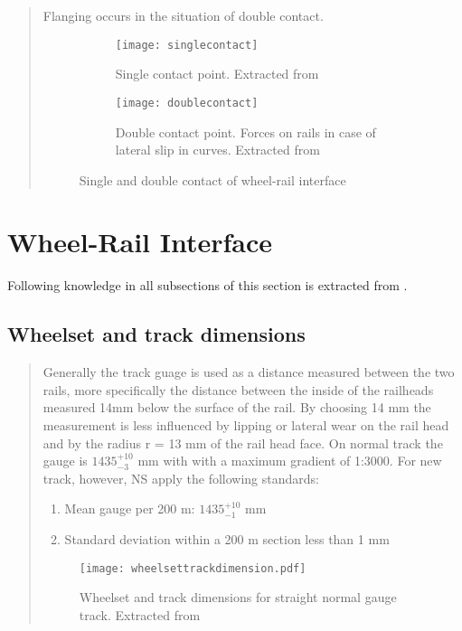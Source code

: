 \begin{quote}
Flanging occurs in the situation of double contact. 

\begin{figure}[h!]
\centering
    \begin{subfigure}[b]{0.2\textwidth}
        \centering
        \texttt{[image: singlecontact]}
        \caption{Single contact point.  Extracted from \citet[Figure 2.13]{esveld2001modern}}
        \label{fig:singlecontact}
    \end{subfigure}
    \begin{subfigure}[b]{0.5\textwidth}
        \texttt{[image: doublecontact]}
        \caption{Double contact point. Forces on rails in case of lateral slip in curves. Extracted from \citet[Figure 2.14]{esveld2001modern}}
        \label{fig:doublecontract}
    \end{subfigure}
    \caption{Single and double contact of wheel-rail interface}
\end{figure}
\end{quote}
\section{Wheel-Rail Interface}
Following knowledge in all subsections of this section is extracted from \citet{esveld2001modern}. 
\subsection{Wheelset and track dimensions}
\begin{quote}
Generally the track guage is used as a distance measured between the two rails, more specifically the distance between the inside of the railheads measured 14mm below the surface of the rail. By choosing 14 mm the measurement is less influenced by lipping or lateral wear on the rail head and by the radius r = 13 mm of the rail head face. On normal track the gauge is $1435^{+10}_{-3}$ mm with with a maximum gradient of 1:3000. For new track, however, NS apply the following standards:

\begin{enumerate}
\item Mean gauge per 200 m: $1435^{+10}_{-1}$ mm
\item Standard deviation within a 200 m section less than 1 mm
\end{enumerate}

\begin{figure}[h]
\centering
\texttt{[image: wheelsettrackdimension.pdf]}
\caption{Wheelset and track dimensions for straight normal gauge track. Extracted from \citet[p.17]{esveld2001modern}}
\label{fig:wheelset and track dimensions}
\end{figure}

\end{quote}

